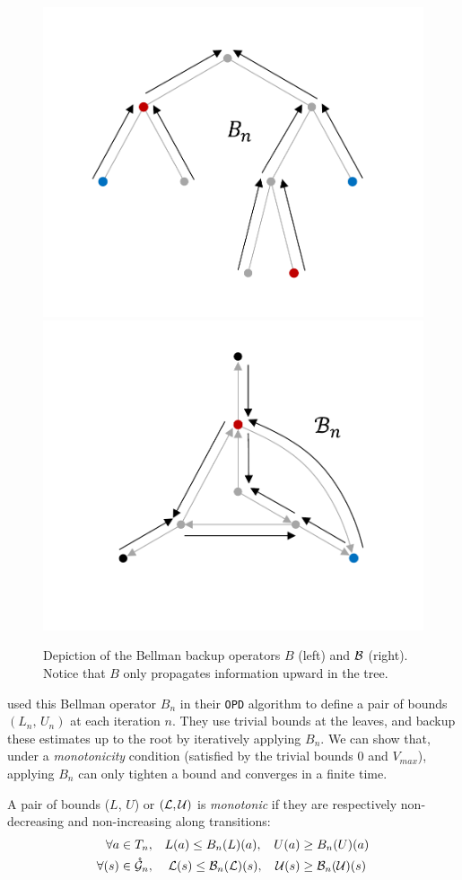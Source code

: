 \documentclass[runningheads]{llncs}
\begin{document}
\begin{figure}[tp]
	\centering
	\includegraphics[trim={1.8cm 1.4cm 1.9cm 1.9cm}, clip,width=0.42\linewidth]{img/tree_2}
	\hfill
	\includegraphics[trim={1.8cm 2.6cm 1.9cm 1.3cm}, clip,width=0.46\linewidth]{img/graph_2}
	\caption{Depiction of the Bellman backup operators $B$ (left) and $\mathcal{B}$ (right). Notice that $B$ only propagates information upward in the tree.}
	\label{fig:bellman}
\end{figure}

\citet{Hren2008optimistic} used this Bellman operator $B_n$ in their \texttt{OPD} algorithm to define a pair of bounds $(L_n,\, U_n)$ at each iteration $n$. They use trivial bounds at the leaves, and backup these estimates up to the root by iteratively applying $B_n$. We can show that, under a \textit{monotonicity} condition (satisfied by the trivial bounds $0$ and $V_{max}$), applying $B_n$ can only tighten a bound and converges in a finite time.

\begin{definition}[Monotonicity]
	A pair of bounds ($L$, $U$) or $(\mathcal{L}, \mathcal{U})$ is \emph{monotonic} if they are respectively non-decreasing and non-increasing along transitions:
	\begin{align*}
	\forall a\in{T}_n, \quad & L(a) \leq B_n(L)(a), & U(a) & \geq B_n(U)(a)\\
	\forall (s)\in\mathring{\mathcal{G}}_n, \quad &\; \mathcal{L}(s) \leq \mathcal{B}_n(\mathcal{L})(s),&   \mathcal{U}(s) & \geq \mathcal{B}_n(\mathcal{U})(s)
	\end{align*}
\end{definition}
\end{document}
